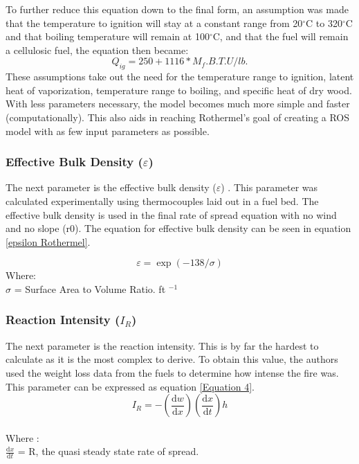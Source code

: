 \documentclass{article}
\begin{document}
To further reduce this equation down to the final form, an assumption was made that the temperature to ignition will stay at a constant range from 20$^{\circ}$C to 320$^{\circ}$C and that boiling temperature will remain at 100$^{\circ}$C, and that the fuel will remain a cellulosic fuel, the equation then became: 
\begin{equation}
\label{Equation 3}
	Q_{ig} = 250 + 1116 * M_f. B.T.U/lb. 
\end{equation}
\indent These assumptions take out the need for the temperature range to ignition, latent heat of vaporization, temperature range to boiling, and specific heat of dry wood. With less parameters necessary, the model becomes much more simple and faster (computationally). This also aids in reaching Rothermel's goal of creating a ROS model with as few input parameters as possible. \\

\subsubsection{Effective Bulk Density ($\varepsilon$)}
\indent The next parameter is the effective bulk density ($\varepsilon$) . This parameter was calculated experimentally using thermocouples laid out in a fuel bed. The effective bulk density is used in the final rate of spread equation with no wind and no slope (r0). The equation for effective bulk density can be seen in equation \ref{epsilon Rothermel}.

\begin{equation}
	\varepsilon = \exp(-138 / \sigma)
	\label{epsilon Rothermel}
\end{equation}
Where: \\
$\sigma$ = Surface Area to Volume Ratio. ft $^{-1}$
\subsubsection{Reaction Intensity ($I_R$)}
\indent The next parameter is the reaction intensity. This is by far the hardest to calculate as it is the most complex to derive. To obtain this value, the authors used the weight loss data from the fuels to determine how intense the fire was. This parameter can be expressed as equation \ref{Equation 4}.
\begin{equation}
	\label{Equation 4}
	I_R = - (\frac {\mathrm {d}w} {\mathrm{d} x}) (\frac {\mathrm {d}x} {\mathrm{d} t}) h 
\end{equation}\\
Where :\\
$\frac {\mathrm {d}x} {\mathrm{d} t}$ = R, the quasi steady state rate of spread. \\
\end{document}
